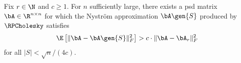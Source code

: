 \begin{theorem}
    \label{thm:rpc-frobenius-error-lower-bound}
    
    Fix $r\in\N$ and $c \geq 1$. For $n$ sufficiently large, there exists a psd matrix $\bA\in\R^{n\times n}$ for which the Nystr\"om approximation $\bA\gen{S}$ produced by $\RPCholesky$ satisfies
    \[\E\left[\|\bA - \bA\gen{S}\|_F^2\right] >c\cdot \|\bA -
        \bA_r\|^2_F\]
    for all $|S| < \sqrt{n}/(4c)$.
\end{theorem}

